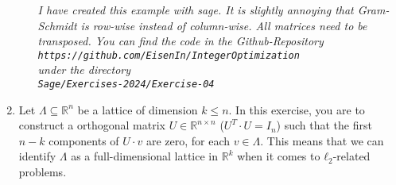 \documentclass[11pt,a4paper]{article}
\begin{document}
\begin{enumerate}[1)]
\begin{enumerate}[i)]
  {\small \emph{I have created this example with sage. It is slightly annoying that Gram-Schmidt is row-wise instead of column-wise. All matrices need to be transposed. You can find the code in the Github-Repository
      {\tt https://github.com/EisenIn/IntegerOptimization} \\
      under the directory\\ 
      {\tt Sage/Exercises-2024/Exercise-04} } }
\end{enumerate}
\item Let $Λ ⊆ ℝ^n$ be a lattice of dimension $k≤n$. In this exercise, you are to construct a orthogonal matrix $U ∈ ℝ^{n × n}$  ($U^T ⋅U = I_n$) such that the first $n-k$ components of  $U ⋅ v$ are zero, for each $v ∈ Λ$. This means that we can identify $Λ$ as a full-dimensional lattice in $ℝ^k$ when it comes to $ℓ_2$-related problems. 


\end{enumerate}
\end{document}
